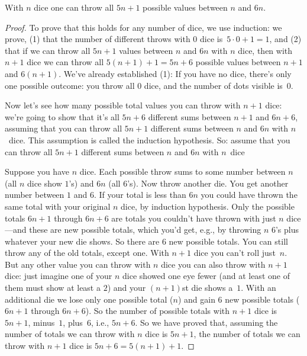 \documentclass[../../../include/open-logic-section]{subfiles}
\begin{document}
\begin{thm}
  With $n$ dice one can throw all $5n+1$ possible values between $n$
  and $6n$.
\end{thm}

\begin{proof}
To prove that this holds for any number of dice, we use induction: we
prove, (1) that the number of different throws with $0$ dice
is~$5\cdot0 + 1 = 1$, and (2) that if we can throw all $5n+1$ values
between $n$ and $6n$ with $n$ dice, then with $n+1$ dice we can
throw all $5(n+1)+1 = 5n+6$ possible values between $n+1$ and
$6(n+1)$.  We've already established (1): If you have no dice,
there's only one possible outcome: you throw all $0$ dice, and the
number of dots visible is~$0$.

Now let's see how many possible total values you can throw with $n+1$
dice: we're going to show that it's all $5n+6$ different sums between
$n+1$ and $6n+6$, assuming that you can throw all $5n+1$ different
sums between $n$ and $6n$ with $n$~dice. This assumption is called the
induction hypothesis.  So: assume that you can throw all $5n+1$
different sums between $n$ and $6n$ with $n$~dice

Suppose you have $n$ dice.  Each possible throw sums to some number
between $n$ (all $n$ dice show $1$'s) and $6n$ (all $6$'s).  Now throw
another die.  You get another number between $1$ and $6$.  If your
total is less than $6n$ you could have thrown the same total with your
original $n$ dice, by induction hypothesis.  Only the possible totals
$6n+1$ through $6n+6$ are totals you couldn't have thrown with just
$n$ dice---and these are new possible totals, which you'd get, e.g.,
by throwing $n$ $6$'s plus whatever your new die shows. So there are
$6$ new possible totals.  You can still throw any of the old totals,
except one. With $n+1$ dice you can't roll just~$n$. But any other
value you can throw with $n$ dice you can also throw with $n+1$ dice:
just imagine one of your $n$ dice showed one eye fewer (and at least
one of them must show at least a $2$) and your $(n+1)$st die shows
a~$1$. With an additional die we lose only one possible
total ($n$) and gain $6$ new possible totals ($6n+1$ through $6n+6$).
So the number of possible totals with $n+1$ dice is $5n+1$, minus~$1$,
plus~$6$, i.e., $5n+6$.  So we have proved that, assuming the number
of totals we can throw with $n$ dice is $5n+1$, the number of totals
we can throw with $n+1$ dice is $5n+6 = 5(n+1) + 1$.
\end{proof}
\end{document}
